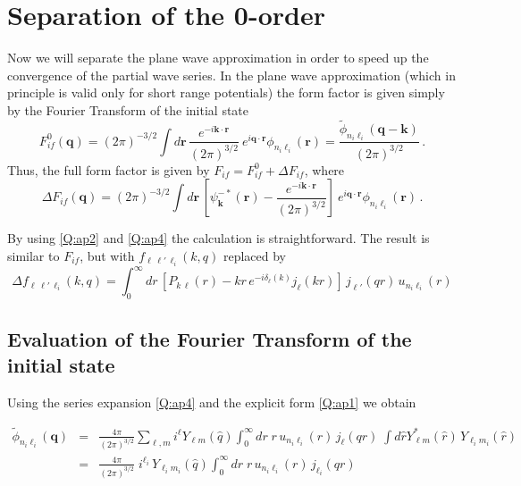 \section{Separation of the 0-order}

Now we will separate the plane wave approximation in order to speed up
the convergence of the partial wave series. In the plane wave
approximation (which in principle is valid only for short range
potentials) the form factor is given simply by the Fourier Transform of
the initial state
\begin{equation}\label{Q:FTwfi}
F^{0}_{if}(\bm{q}) = (2 \pi)^{-3/2} \int d \bm{r} \,
\frac{e^{-i \bm{k} \cdot \bm{r}}}{(2 \pi)^{3/2}} \ e^{i
\bm{q} \cdot \bm{r}} \phi_{n_{i} \ell_{i}}(\bm{r}) =
\frac{\tilde{\phi}_{n_{i} \ell_{i}}(\bm{q}-\bm{k})}{(2 \pi)^{3/2}}\, .
\end{equation}
%
Thus, the full form factor is given by $F_{if} = F^{0}_{if} + \Delta
F_{if}$, where
%
\[
\Delta F_{if} (\bm{q}) = (2 \pi)^{-3/2} \int d \bm{r} \,\left[
\psi_{\bm{k}}^{-*}(\bm{r}) - \frac{e^{-i \bm{k} \cdot \bm{r}}}{(2
\pi)^{3/2}} \right] \ e^{i \bm{q} \cdot \bm{r}} \phi_{n_{i}
\ell_{i}}(\bm{r}) \, .
\]

By using \ref{Q:ap2} and \ref{Q:ap4}  the calculation is
straightforward. The result is similar to $F_{if}$, but with $f_{\ell
\, \ell'\, \ell_{i}}(k,q)$ replaced by
\[
\Delta f_{\ell \, \ell'\, \ell_{i}}(k,q) = \int_{0}^{\infty} d r \,
\left[ P_{k\, \ell}(r) - kr \, e^{- i \delta_{\ell}(k)}
j_{\ell}(kr) \right] \, j_{\ell'}(q r) \, u_{n_{i} \ell_{i}}(r)
\]

\subsection{Evaluation of the Fourier Transform of the initial state}

Using the series expansion \ref{Q:ap4} and the explicit form
\ref{Q:ap1} we obtain

\begin{eqnarray*}
\tilde{\phi}_{n_{i} \ell_{i}}(\bm{q}) &=& \frac{4 \pi}{(2 \pi)^{3/2}}
\sum_{\ell,m} i^{\ell} Y_{\ell m}(\hat{q}) \int_{0}^{\infty} d r
\; r\, u_{n_{i} \ell_{i}}(r)\, j_{\ell}(q r) \; \int d \hat{r}
Y^{*}_{\ell
m}(\hat{r}) \, Y_{\ell_{i} m_{i}}(\hat{r}) \\
&=& \frac{4 \pi}{(2 \pi)^{3/2}} \; i^{\ell_{i}} \, Y_{\ell_{i}
m_{i}}(\hat{q}) \int_{0}^{\infty} d r \; r\, u_{n_{i} \ell_{i}}(r)\,
j_{\ell_{i}}(q r)
\end{eqnarray*}

